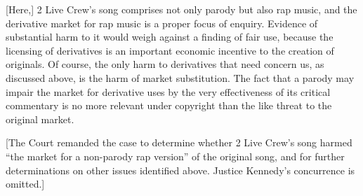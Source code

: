 [Here,] 2 Live Crew's song
comprises not only parody but also rap music, and the derivative market for rap
music is a proper focus of enquiry.
Evidence of substantial harm to it would weigh against a
finding of fair use, because
the licensing of derivatives is an important economic incentive to the creation
of originals.
Of course, the only harm to derivatives that need concern us,
as discussed above, is the harm of market substitution. The fact that a parody
may impair the market for derivative uses by the very effectiveness of its
critical commentary is no more relevant under copyright than the like threat to
the original market.

[The Court remanded the case to determine whether 2 Live Crew's song harmed
``the market for a non-parody rap version'' of the original song, and for
further determinations on other issues identified above. Justice Kennedy's
concurrence is omitted.]

